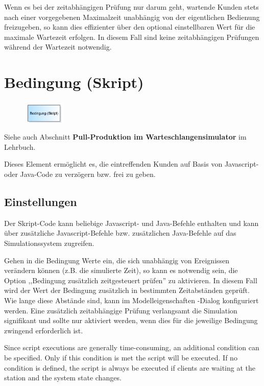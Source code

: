 Wenn es bei der zeitabhängigen Prüfung nur darum geht, wartende Kunden stets nach einer vorgegebenen Maximalzeit unabhängig von der eigentlichen
Bedienung freizugeben, so kann dies effizienter über den optional einstellbaren Wert für die maximale Wartezeit erfolgen. In diesem Fall sind
keine zeitabhängigen Prüfungen während der Wartezeit notwendig.


\section{Bedingung (Skript)}
\label{ref:ModelElementHoldJS}

\begin{figure}
\vspace{-22pt}
\includegraphics[width=2cm]{imageModelElementHoldJS.png}
\vspace{-22pt}
\end{figure}

Siehe auch Abschnitt \textbf{Pull-Produktion im Warteschlangensimulator} im Lehrbuch.

Dieses Element ermöglicht es, die eintreffenden Kunden auf Basis von Javascript-
oder Java-Code zu verzögern bzw. frei zu geben.

\subsection*{Einstellungen}

Der Skript-Code kann beliebige Javascript- und Java-Befehle enthalten und kann über
zusätzliche Javascript-Befehle bzw. zusätzlichen Java-Befehle 
auf das Simulationssystem zugreifen.

Gehen in die Bedingung Werte ein, die sich unabhängig von Ereignissen verändern können (z.B. die simulierte Zeit), so kann es notwendig sein,
die Option ,,Bedingung zusätzlich zeitgesteuert prüfen'' zu aktivieren. In diesem Fall wird der Wert der Bedingung zusätzlich in bestimmten
Zeitabständen geprüft. Wie lange diese Abstände sind, kann im Modelleigenschaften -Dialog konfiguriert
werden. Eine zusätzlich zeitabhängige Prüfung verlangsamt die Simulation signifikant und sollte nur aktiviert werden, wenn dies für die
jeweilige Bedingung zwingend erforderlich ist.

Since script executions are generally time-consuming, an additional condition can be specified.
Only if this condition is met the script will be executed. If no condition is defined, the script
is always be executed if clients are waiting at the station and the system state changes.


